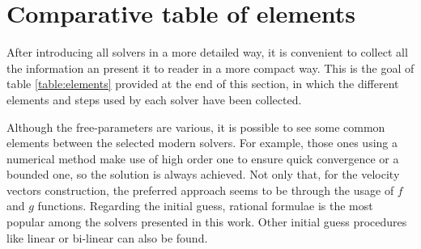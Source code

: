 \section{Comparative table of elements}

After introducing all solvers in a more detailed way, it is convenient to
collect all the information an present it to reader in a more compact way. This
is the goal of table \ref{table:elements} provided at the end of this section, in which the different
elements and steps used by each solver have been collected.

Although the free-parameters are various, it is possible to see some common
elements between the selected modern solvers. For example, those ones using a
numerical method make use of high order one to ensure quick convergence or a
bounded one, so the solution is always achieved. Not only that, for the velocity
vectors construction, the preferred approach seems to be through the usage of
$f$ and $g$ functions. Regarding the initial guess, rational formulae is the
most popular among the solvers presented in this work. Other initial guess
procedures like linear or bi-linear can also be found.


